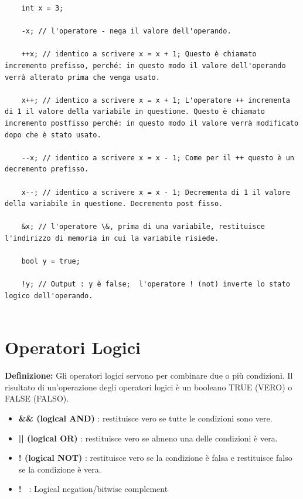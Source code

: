 \begin{lstlisting}
	int x = 3;
	
	-x; // l'operatore - nega il valore dell'operando.
	
	++x; // identico a scrivere x = x + 1; Questo è chiamato incremento prefisso, perché: in questo modo il valore dell'operando verrà alterato prima che venga usato.
	
	x++; // identico a scrivere x = x + 1; L'operatore ++ incrementa di 1 il valore della variabile in questione. Questo è chiamato incremento postfisso perché: in questo modo il valore verrà modificato dopo che è stato usato.
	
	--x; // identico a scrivere x = x - 1; Come per il ++ questo è un decremento prefisso.
	
	x--; // identico a scrivere x = x - 1; Decrementa di 1 il valore della variabile in questione. Decremento post fisso.
	
	&x; // l'operatore \&, prima di una variabile, restituisce l'indirizzo di memoria in cui la variabile risiede.
	
	bool y = true;
	
	!y; // Output : y è false;  l'operatore ! (not) inverte lo stato logico dell'operando.
	
\end{lstlisting}


\section{Operatori Logici}

\textsf{\small \textbf{Definizione: } Gli operatori logici servono per combinare due o più condizioni. Il risultato di un'operazione degli operatori logici è un booleano TRUE (VERO) o FALSE (FALSO).} \\

\begin{itemize}
	\item \textsf{\small \textbf{\&\& (logical AND)} : restituisce vero se tutte le condizioni sono vere.}
	\item \textsf{\small \textbf{|| (logical OR)} : restituisce vero se almeno una delle condizioni è vera.}
	\item \textsf{\small \textbf{! (logical NOT)} : restituisce vero se la condizione è falsa e restituisce falso se la condizione è vera.}
	\item \textsf{\small \textbf{!~} : Logical negation/bitwise complement} 
\end{itemize}

